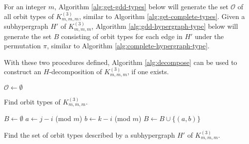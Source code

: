 For an integer $m$, Algorithm \ref{alg:get-gdd-types} below will generate the set $\mathcal{O}$ of all orbit types of $K_{m,m,m}^{(3)}$, similar to Algorithm \ref{alg:get-complete-types}.
Given a subhypergraph $H'$ of $K_{m,m,m}^{(3)}$, Algorithm \ref{alg:gdd-hypergraph-type} below will generate the set $B$ consisting of orbit types for each edge in $H'$ under the permutation $\pi$, similar to Algorithm \ref{alg:complete-hypergraph-type}.

With these two procedures defined, Algorithm \ref{alg:decompose} can be used to construct an $H$-decomposition of $K_{m,m,m}^{(3)}$, if one exists.


\begin{algorithm}

$\mathcal{O} \gets \emptyset$\;


\;

\caption{Find orbit types of $K_{m,m,m}^{(3)}$.} \label{alg:get-gdd-types}
\end{algorithm}

\begin{algorithm}
$B \gets \emptyset$\;
 {
    $a \gets j-i$ (mod $m$)\;
    $b \gets k-i$ (mod $m$)\;
    $B \gets B \cup \{(a, b)\}$\;
}
\;
\caption{Find the set of orbit types described by a subhypergraph $H'$ of $K_{m,m,m}^{(3)}$.} \label{alg:gdd-hypergraph-type}
\end{algorithm}

\newpage

